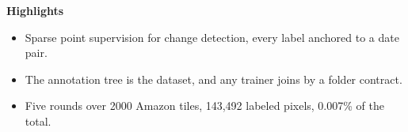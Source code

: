 
\noindent\textbf{Highlights}
\begin{itemize}
  \setlength{\itemsep}{2pt}
  \item Sparse point supervision for change detection, every label
        anchored to a date pair.
  \item The annotation tree is the dataset, and any trainer joins by
        a folder contract.
  \item Five rounds over 2000 Amazon tiles, 143,492 labeled pixels,
        0.007\% of the total.
\end{itemize}
